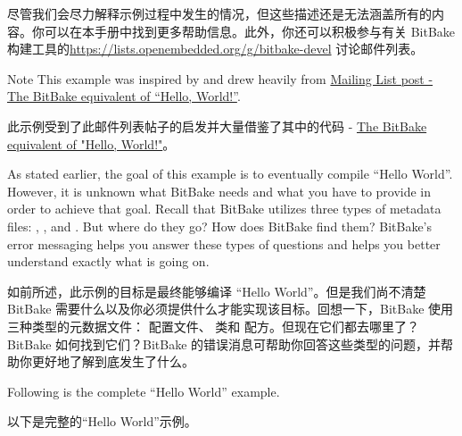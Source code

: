 尽管我们会尽力解释示例过程中发生的情况，但这些描述还是无法涵盖所有的​​内容。你可以在本手册中找到更多帮助信息。此外，你还可以积极参与有关 BitBake 构建工具的\url{https://lists.openembedded.org/g/bitbake-devel} 讨论邮件列表。

\begin{noteblock}{Note}%
This example was inspired by and drew heavily from \href{https://www.mail-archive.com/yocto@yoctoproject.org/msg09379.html}{Mailing List post - The BitBake equivalent of “Hello, World!”}.

\medskip
此示例受到了此邮件列表帖子的启发并大量借鉴了其中的代码 - \href{https://www.mail-archive.com/yocto@yoctoproject.org/msg09379.html}{The BitBake equivalent of "Hello, World!"}。
\end{noteblock}

As stated earlier, the goal of this example is to eventually compile “Hello World”. However, it is unknown what BitBake needs and what you have to provide in order to achieve that goal. Recall that BitBake utilizes three types of metadata files: , , and . But where do they go? How does BitBake find them? BitBake’s error messaging helps you answer these types of questions and helps you better understand exactly what is going on.

如前所述，此示例的目标是最终能够编译 ``Hello World''。但是我们尚不清楚 BitBake 需要什么以及你必须提供什么才能实现该目标。回想一下，BitBake 使用三种类型的元数据文件： 配置文件、 类和 配方。但现在它们都去哪里了？BitBake 如何找到它们？BitBake 的错误消息可帮助你回答这些类型的问题，并帮助你更好地了解到底发生了什么。

Following is the complete “Hello World” example.

以下是完整的“Hello World”示例。

